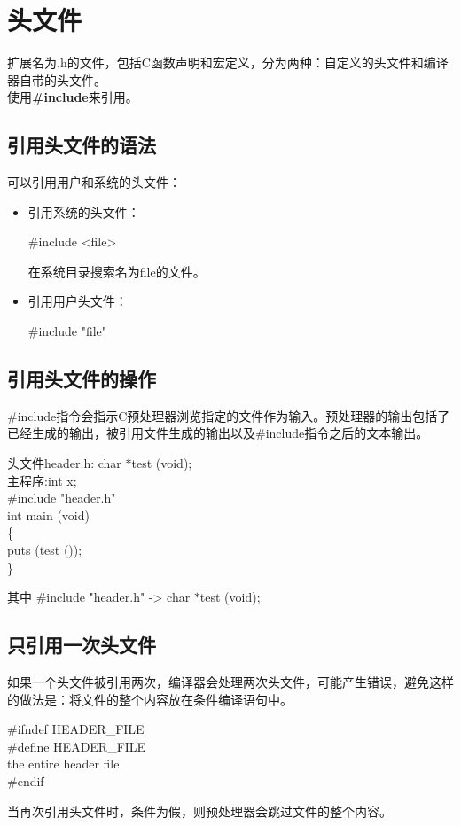 \documentclass[UTF8]{ctexart}
\begin{document}
			\section{头文件}
			扩展名为.h的文件，包括C函数声明和宏定义，分为两种：自定义的头文件和编译器自带的头文件。\\
			使用\textbf{\#include}来引用。
			\subsection{引用头文件的语法}
			可以引用用户和系统的头文件：\begin{itemize}
				\item 引用系统的头文件：\begin{framed}
					\#include <file>
				\end{framed}在系统目录搜索名为file的文件。
				\item 引用用户头文件：\begin{framed}
					\#include "file"
				\end{framed}
			\end{itemize}
			\subsection{引用头文件的操作}
			\#include指令会指示C预处理器浏览指定的文件作为输入。预处理器的输出包括了已经生成的输出，被引用文件生成的输出以及\#include指令之后的文本输出。
			\begin{framed}
				头文件header.h: char $*$test (void);\\
				主程序:int x;\\
				\#include "header.h"\\
				int main (void)\\
				\{\\
					puts (test ());\\
				\}\\
			\end{framed}
			其中 \#include "header.h" -> char $*$test (void);
			\subsection{只引用一次头文件}
			如果一个头文件被引用两次，编译器会处理两次头文件，可能产生错误，避免这样的做法是：将文件的整个内容放在条件编译语句中。
			\begin{framed}
				\#ifndef HEADER\_FILE\\
				\#define HEADER\_FILE\\
				the entire header file \\
				\#endif\\
			\end{framed}当再次引用头文件时，条件为假，则预处理器会跳过文件的整个内容。
\end{document}
